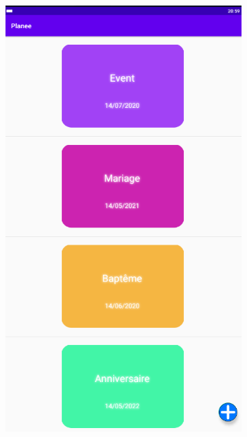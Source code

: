 \documentclass[12pt,a4paper]{report}
\begin{document}
\begin{flushleft}
\begin{figure}[!h]
\begin{subfigure}[b]{0.3\textwidth}
        \includegraphics[width=\textwidth]{HomeWEvents}
    \end{subfigure}
    \begin{subfigure}[b]{0.3\textwidth}

\end{subfigure}
\end{figure}
\end{flushleft}
\end{document}
